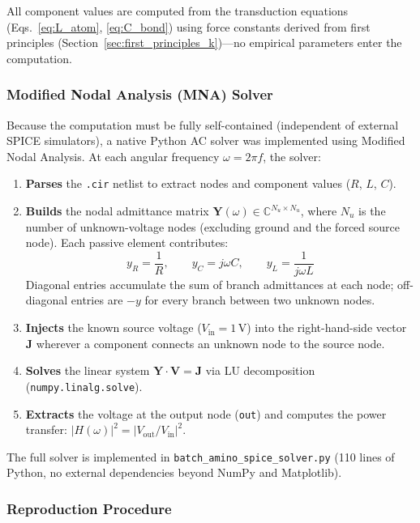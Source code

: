 \noindent All component values are computed from the transduction equations (Eqs.~\ref{eq:L_atom}, \ref{eq:C_bond}) using force constants derived from first principles (Section~\ref{sec:first_principles_k})---no empirical parameters enter the computation.

\subsubsection{Modified Nodal Analysis (MNA) Solver}

Because the computation must be fully self-contained (independent of external SPICE simulators), a native Python AC solver was implemented using Modified Nodal Analysis. At each angular frequency $\omega = 2\pi f$, the solver:

\begin{enumerate}
    \item \textbf{Parses} the \texttt{.cir} netlist to extract nodes and component values ($R$, $L$, $C$).
    \item \textbf{Builds} the nodal admittance matrix $\mathbf{Y}(\omega) \in \mathbb{C}^{N_u \times N_u}$, where $N_u$ is the number of unknown-voltage nodes (excluding ground and the forced source node).  Each passive element contributes:
    \begin{equation}
        y_R = \frac{1}{R}, \qquad y_C = j\omega C, \qquad y_L = \frac{1}{j\omega L}
    \end{equation}
    Diagonal entries accumulate the sum of branch admittances at each node; off-diagonal entries are $-y$ for every branch between two unknown nodes.
    \item \textbf{Injects} the known source voltage ($V_\text{in} = 1$\,V) into the right-hand-side vector $\mathbf{J}$ wherever a component connects an unknown node to the source node.
    \item \textbf{Solves} the linear system $\mathbf{Y} \cdot \mathbf{V} = \mathbf{J}$ via LU decomposition (\texttt{numpy.linalg.solve}).
    \item \textbf{Extracts} the voltage at the output node (\texttt{out}) and computes the power transfer: $|H(\omega)|^2 = |V_\text{out}/V_\text{in}|^2$.
\end{enumerate}

\noindent The full solver is implemented in \texttt{batch\_amino\_spice\_solver.py} (110 lines of Python, no external dependencies beyond NumPy and Matplotlib).

\subsubsection{Reproduction Procedure}

